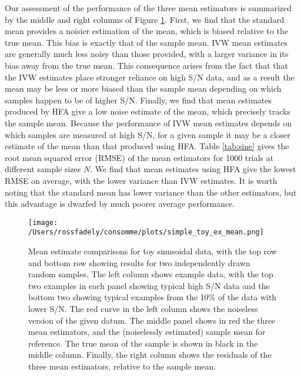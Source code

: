 \documentclass[12pt,preprint]{aastex}
\begin{document}
Our assessment of the performance of the three mean estimators is summarized by the middle 
and right columns of Figure \ref{fig:sine-toy-mean}.  First, we find that the standard mean provides 
a noisier estimation of the mean, which is biased relative to the true mean.  This bias is exactly 
that of the sample mean.  IVW mean estimates are generally much less 
noisy than those provided, with a larger variance in its bias away from the true mean.  This 
consequence arises from the fact that that the IVW estimates place 
stronger reliance on high S/N data, and as a result the mean may be less or more biased than 
the sample mean depending on which samples happen to be of higher S/N.  Finally, we find that 
mean estimates produced by HFA give a low noise estimate of the mean, which precisely tracks 
the sample mean.  Because the performance of IVW mean estimates depends on which samples 
are measured at high S/N, for a given sample it may be a closer estimate of the mean than that 
produced using HFA.  Table \ref{tab:sine} gives the root mean squared error (RMSE) of the mean 
estimators for 1000 trials at different sample sizes $N$.  We find that mean estimates using HFA 
give the lowest RMSE on average, with the lower variance than IVW estimates.  It is worth noting 
that the standard mean has lower variance than the other estimators, but this advantage is dwarfed 
by much poorer average performance.

\begin{figure}[ht]
\centering
 \texttt{[image: /Users/rossfadely/consomme/plots/simple\_toy\_ex\_mean.png]}
\caption{Mean estimate comparisons for toy sinusoidal data, with the top row and bottom row showing results for two independently drawn random samples.  The left column shows example data, with the top two examples in each panel showing typical high S/N data and the bottom two showing typical examples from the 10\% of the data with lower S/N.  The red curve in the left column shows the noiseless version of the given datum.  The middle panel shows in red the three mean estimators, and the (noiselessly estimated) sample mean for reference.  The true mean of the sample is shown in black in the middle column.  Finally, the right column shows the residuals of the three mean estimators, relative to the sample mean.}
\label{fig:sine-toy-mean}
\end{figure}
\end{document}
